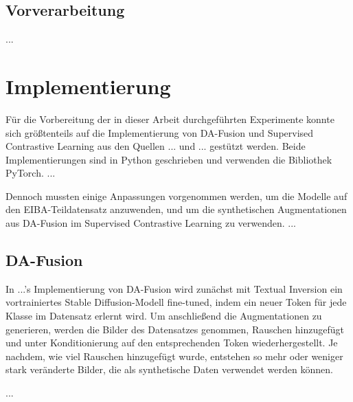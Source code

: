 \subsection{Vorverarbeitung}


...

\section{Implementierung}


Für die Vorbereitung der in dieser Arbeit durchgeführten Experimente konnte sich größtenteils auf die Implementierung von DA-Fusion und Supervised Contrastive Learning aus den Quellen ... und ... gestützt werden. Beide Implementierungen sind in Python geschrieben und verwenden die Bibliothek PyTorch. ...

Dennoch mussten einige Anpassungen vorgenommen werden, um die Modelle auf den EIBA-Teildatensatz anzuwenden, und um die synthetischen Augmentationen aus DA-Fusion im Supervised Contrastive Learning zu verwenden. ...

\subsection{DA-Fusion}


In ...'s Implementierung von DA-Fusion wird zunächst mit Textual Inversion ein vortrainiertes Stable Diffusion-Modell fine-tuned, indem ein neuer Token für jede Klasse im Datensatz erlernt wird. Um anschließend die Augmentationen zu generieren, werden die Bilder des Datensatzes genommen, Rauschen hinzugefügt und unter Konditionierung auf den entsprechenden Token wiederhergestellt. Je nachdem, wie viel Rauschen hinzugefügt wurde, entstehen so mehr oder weniger stark veränderte Bilder, die als synthetische Daten verwendet werden können.

...

